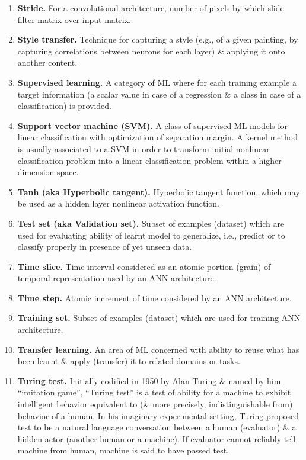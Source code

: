 \documentclass{article}
\begin{document}
\begin{itemize}
\begin{enumerate}
		\item {\bf Stride.} For a convolutional architecture, number of pixels by which slide filter matrix over input matrix.
		\item {\bf Style transfer.} Technique for capturing a style (e.g., of a given painting, by capturing correlations between neurons for each layer) \& applying it onto another content.
		\item {\bf Supervised learning.} A category of ML where for each training example a target information (a scalar value in case of a regression \& a class in case of a classification) is provided.
		\item {\bf Support vector machine (SVM).} A class of supervised ML models for linear classification with optimization of separation margin. A kernel method is usually associated to a SVM in order to transform initial nonlinear classification problem into a linear classification problem within a higher dimension space.
		\item {\bf Tanh (aka Hyperbolic tangent).} Hyperbolic tangent function, which may be used as a hidden layer nonlinear activation function.
		\item {\bf Test set (aka Validation set).} Subset of examples (dataset) which are used for evaluating ability of learnt model to generalize, i.e., predict or to classify properly in presence of yet unseen data.
		\item {\bf Time slice.} Time interval considered as an atomic portion (grain) of temporal representation used by an ANN architecture.
		\item {\bf Time step.} Atomic increment of time considered by an ANN architecture.
		\item {\bf Training set.} Subset of examples (dataset) which are used for training ANN architecture.
		\item {\bf Transfer learning.} An area of ML concerned with ability to reuse what has been learnt \& apply (transfer) it to related domains or tasks.
		\item {\bf Turing test.} Initially codified in 1950 by {\sc Alan Turing} \& named by him ``imitation game'', ``Turing test'' is a test of ability for a machine to exhibit intelligent behavior equivalent to (\& more precisely, indistinguishable from) behavior of a human. In his imaginary experimental setting, {\sc Turing} proposed test to be a natural language conversation between a human (evaluator) \& a hidden actor (another human or a machine). If evaluator cannot reliably tell machine from human, machine is said to have passed test.

\end{enumerate}
\end{itemize}
\end{document}
